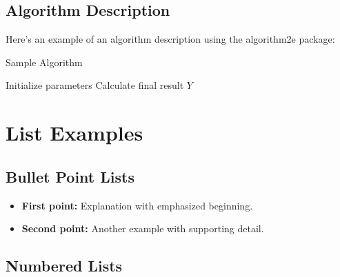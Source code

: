 \documentclass[a4paper,11pt]{article}
\begin{document}
% 

\subsection{Algorithm Description}

Here's an example of an algorithm description using the algorithm2e package:

\begin{algorithm}[H]
\caption{Sample Algorithm}
\SetAlgoLined
{}
Initialize parameters\;
Calculate final result $Y$\;
\;
\end{algorithm}

\section{List Examples}

\subsection{Bullet Point Lists}

\begin{itemize}
    \item \textbf{First point:} Explanation with emphasized beginning.
    
    \item \textbf{Second point:} Another example with supporting detail.
\end{itemize}

\subsection{Numbered Lists}
\end{document}
